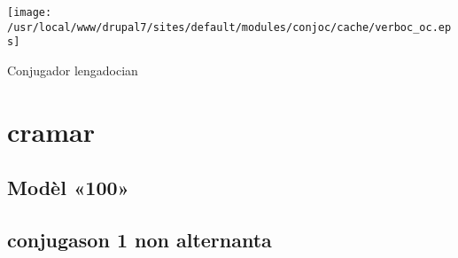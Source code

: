 \documentclass[10pt,a4paper,final]{article}
\author{Òsca-Font dubèrta}
\begin{document}
\begin{center}
\texttt{[image: /usr/local/www/drupal7/sites/default/modules/conjoc/cache/verboc\_oc.eps]}
\end{center}

\begin{center}
\huge{Conjugador lengadocian}
\end{center}

\section*{cramar}
\subsection*{Modèl «100»}
\subsection*{conjugason 1 non alternanta}
\end{document}
